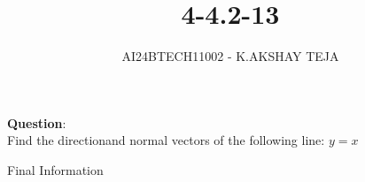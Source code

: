 \documentclass[journal]{IEEEtran}
\begin{document}

\vspace{3cm}

\title{4-4.2-13}
\author{AI24BTECH11002 - K.AKSHAY TEJA}
{\let\newpage\relax\maketitle}

\renewcommand{\thefigure}{\theenumi}
\renewcommand{\thetable}{\theenumi}
\setlength{\intextsep}{10pt} %


\renewcommand{\thetable}{\theenumi}


\textbf{Question}:\\
Find the directionand normal vectors of the following line: $y=x$

\solution
\begin{table}[h!]
	\centering
	
	\caption{Final Information}
	\label{tab:4-4.2-13}
\end{table}
\end{document}
